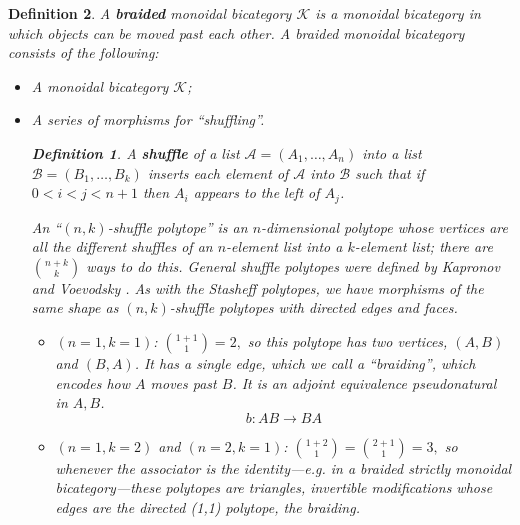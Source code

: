 \documentclass{article}
\newtheorem{defn}{Definition}
\newcommand{\C}{ {\mathcal{K}}  }
\begin{document}
\begin{defn}
  A {\bf braided} monoidal bicategory $\C$ is a monoidal bicategory in which objects can be moved past each other.  A braided monoidal bicategory consists of the following:
  \begin{itemize}
    \item A monoidal bicategory $\C$;
    \item A series of morphisms for ``shuffling''.  
    \begin{defn}
      A {\bf shuffle} of a list $\mathcal{A} = (A_1, \ldots, A_n)$ into a list $\mathcal{B} = (B_1, \ldots, B_k)$ inserts each element of
$\mathcal{A}$ into $\mathcal{B}$ such that if $0 < i < j < n+1$ then
$A_i$ appears to the left of $A_j$.
    \end{defn}

    An ``$(n,k)$-shuffle polytope'' is an $n$-dimensional polytope whose vertices are all the different shuffles of an $n$-element list into a
$k$-element list; there are ${n+k \choose k}$ ways to do this.  General shuffle polytopes were defined by Kapronov and Voevodsky \cite{KV94}. As with the Stasheff polytopes, we have morphisms of the same shape as $(n, k)$-shuffle polytopes with directed edges and faces.
    \begin{itemize}
      \item $(n=1,k=1)$: ${{1+1} \choose 1} = 2,$ so this polytope has two vertices, $(A,B)$ and $(B,A)$.  It has a single edge, which we call a ``braiding'', which encodes how $A$ moves past $B$.  It is an adjoint equivalence pseudonatural in $A, B$.
        \[ b:AB \to BA \]
      \item $(n=1,k=2)$ and $(n=2,k=1)$: ${{1+2} \choose 1} = {{2+1}
\choose 1} = 3,$ so whenever the associator is the identity---{\em e.g.} in a braided strictly monoidal bicategory---these polytopes are triangles, invertible modifications whose edges are the directed (1,1) polytope, the braiding.
        \begin{center}

\end{center}
\end{itemize}
\end{itemize}
\end{defn}
\end{document}
